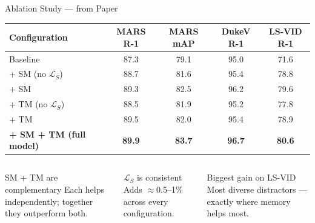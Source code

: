 \documentclass[aspectratio=169]{beamer}
\newcommand{\bt}[1]{\textbf{#1}}
\begin{document}
\begin{frame}{Ablation Study --- from Paper}
  \begin{table}
    \centering
    \renewcommand{\arraystretch}{1.2}
    \begin{tabular}{@{}lcccc@{}}
      \toprule
      \textbf{Configuration} & \textbf{MARS R-1} & \textbf{MARS mAP} & \textbf{DukeV R-1} & \textbf{LS-VID R-1} \\
      \midrule
      Baseline                                & 87.3 & 79.1 & 95.0 & 71.6 \\
      + SM (no $\mathcal{L}_S$)              & 88.7 & 81.6 & 95.4 & 78.8 \\
      + SM                                   & 89.3 & 82.5 & 96.2 & 79.6 \\
      + TM (no $\mathcal{L}_S$)              & 88.5 & 81.9 & 95.2 & 77.8 \\
      + TM                                   & 89.5 & 82.0 & 95.4 & 78.9 \\
      \rowcolor{lightgold}
      \bt{+ SM + TM (full model)}            & \bt{89.9} & \bt{83.7} & \bt{96.7} & \bt{80.6} \\
      \bottomrule
    \end{tabular}
  \end{table}

  \vspace{0.2em}
  \begin{columns}[T]
      \begin{exampleblock}{\small SM + TM are complementary}
        \footnotesize Each helps independently; together they outperform both.
      \end{exampleblock}
      \begin{exampleblock}{\small $\mathcal{L}_S$ is consistent}
        \footnotesize Adds $\approx$0.5--1\% across every configuration.
      \end{exampleblock}
      \begin{exampleblock}{\small Biggest gain on LS-VID}
        \footnotesize Most diverse distractors --- exactly where memory helps most.
      \end{exampleblock}
  \end{columns}
\end{frame}
\end{document}

